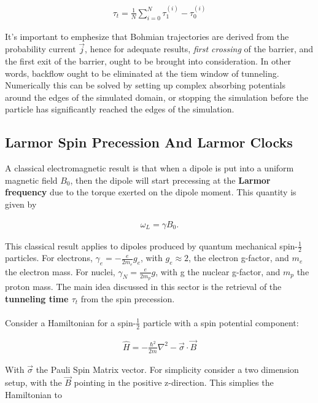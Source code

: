 \begin{align}
    \tau_t = \frac{1}{N} \sum_{i=0}^{N} \tau_{1}^{(i)} - \tau_{0}^{(i)}
\end{align}

It's important to emphesize that Bohmian trajectories are derived from the probability current $\vec{j}$, hence for adequate results, \textit{first crossing} of the barrier, and the first exit of the barrier, ought to be brought into consideration. In other words, backflow ought to be eliminated at the tiem window of tunneling. Numerically this can be solved by setting up complex absorbing potentials around the edges of the simulated domain, or stopping the simulation before the particle has significantly reached the edges of the simulation.

\subsection{Larmor Spin Precession And Larmor Clocks}
\label{ap:larmorspinprecession}

A classical electromagnetic result is that when a dipole is put into a uniform magnetic field $B_0$, then the dipole will start precessing at the \textbf{Larmor frequency} due to the torque exerted on the dipole moment. This quantity is given by

\begin{align}
    \omega_L = \gamma B_0.
\end{align}

This classical result applies to dipoles produced by quantum mechanical spin-$\frac{1}{2}$ particles. For electrons, $\gamma_e=-\frac{e}{2m_e}g_e$, with $g_e \approx2$, the electron g-factor, and $m_e$ the electron mass. For nuclei, $\gamma_N = \frac{e}{2 m_p}g$, with g the nuclear g-factor, and $m_p$ the proton mass. The main idea discussed in this sector is the retrieval of the \textbf{tunneling time $\tau_t$} from the spin precession.
\\\\
Consider a Hamiltonian for a spin-$\frac{1}{2}$ particle with a spin potential component:

\begin{align}
    \hat{H} = -\frac{\hbar^2}{2m} \nabla^2 - \vec{\sigma} \cdot \vec{B}
\end{align}

With $\vec{\sigma}$ the Pauli Spin Matrix vector. For simplicity consider a two dimension setup, with the $\vec{B}$ pointing in the positive z-direction. This simplies the Hamiltonian to

